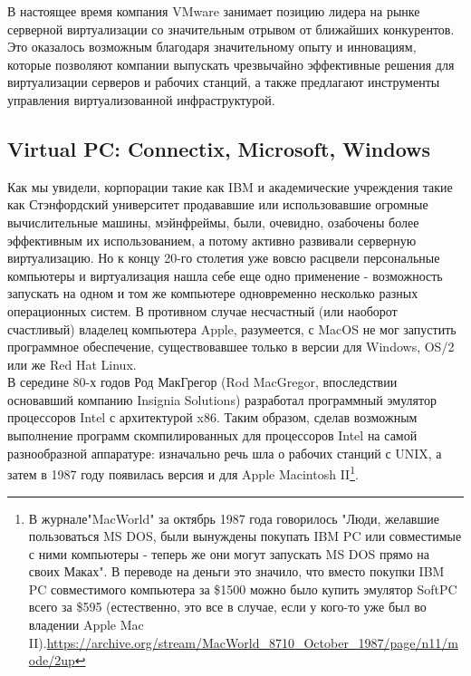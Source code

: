 \documentclass[14pt, a4paper]{article}
\begin{document}
В настоящее время компания VMware занимает позицию лидера на рынке серверной
виртуализации со значительным отрывом от ближайших конкурентов. Это оказалось
возможным благодаря значительному опыту и инновациям, которые позволяют
компании выпускать чрезвычайно эффективные решения для виртуализации серверов
и рабочих станций, а также предлагают инструменты управления виртуализованной
инфраструктурой.

\subsection*{Virtual PC: Connectix, Microsoft, Windows}

Как мы увидели, корпорации такие как IBM и академические учреждения такие как
Стэнфордский университет продававшие или использовавшие огромные
вычислительные машины, мэйнфреймы, были, очевидно, озабочены более
эффективным их использованием, а потому активно развивали серверную виртуализацию. Но к концу 20-го столетия уже вовсю расцвели персональные
компьютеры и виртуализация нашла себе еще одно применение - возможность
запускать на одном и том же компьютере одновременно несколько разных
операционных систем. В противном случае несчастный (или наоборот счастливый)
владелец компьютера Apple, разумеется, с MacOS не мог запустить программное
обеспечение, существовавшее только в версии для Windows, OS/2 или же Red Hat
Linux.\\

В середине 80-х годов Род МакГрегор (Rod MacGregor, впоследствии основавший
компанию Insignia Solutions) разработал программный эмулятор процессоров Intel с
архитектурой x86. Таким образом, сделав возможным выполнение программ
скомпилированных для процессоров Intel на самой разнообразной аппаратуре:
изначально речь шла о рабочих станций с UNIX, а затем в 1987 году появилась версия
и для Apple Macintosh II\footnote{В журнале"MacWorld" за октябрь 1987 года говорилось "Люди, желавшие пользоваться MS
DOS, были вынуждены покупать IBM PC или совместимые с ними компьютеры - теперь же они
могут запускать MS DOS прямо на своих Маках". В переводе на деньги это значило, что вместо
покупки IBM PC совместимого компьютера за \$1500 можно было купить эмулятор SoftPC всего
за \$595 (естественно, это все в случае, если у кого-то уже был во владении Apple Mac II).\href{https://archive.org/stream/MacWorld_8710_October_1987/page/n11/mode/2up}{https://archive.org/stream/MacWorld\_8710\_October\_1987/page/n11/mode/2up}}.\\
\end{document}
